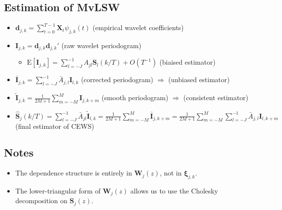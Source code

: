 \documentclass{article}
\numberwithin{equation}{section}
\let \oldsum \sum
\renewcommand{\sum}{\displaystyle \oldsum}
\newcommand{\CEWS}[2]{\bm{S}_{#1}\left(#2/T\right)}
\newcommand{\wavelet}[3]{\psi_{#1,#2}(#3)}
\newcommand{\increment}[2]{\bm{\xi}_{#1,#2}}
\newcommand{\coeffs}[2]{\bm{d}_{#1,#2}}
\newcommand{\rawPeriodo}[2]{\bm{I}_{#1,#2}}
\newcommand{\correctedPeriodo}[2]{\bar{\bm{I}}_{#1,#2}}
\newcommand{\smoothPeriodo}[2]{\widetilde{\bm{I}}_{#1,#2}}
\newcommand{\estimCEWS}[2]{\widehat{\bm{S}}_{#1}\left(#2/T\right)}
\newcommand{\E}[1]{\mathrm{E}\left[#1\right]}
\begin{document}
\subsection{Estimation of MvLSW}
\begin{itemize}
	\item $\coeffs{j}{k} = \sum_{t=0}^{T-1}\bm{X}_t \wavelet{j}{k}{t}$  \hspace{2cm} (empirical wavelet coefficients)
	\item $\rawPeriodo{j}{k} = \coeffs{j}{k}\coeffs{j}{k}'$  \hspace{2cm} (raw wavelet periodogram)
		\begin{itemize}
			\item $\E{\rawPeriodo{j}{k}} = \sum_{l=-J}^{-1} A_{jl}\CEWS{l}{k} + O(T^{-1})$ \hspace{2cm} (biaised estimator)
		\end{itemize}
	\item $\correctedPeriodo{j}{k} = \sum_{l=-J}^{-1} \bar{A}_{j,l}\rawPeriodo{l}{k}$ \hspace{2cm} (corrected periodogram) $\Longrightarrow$ (unbiased estimator)
	\item $\smoothPeriodo{j}{k} = \frac{\displaystyle 1}{\displaystyle 2M+1} \sum_{m=-M}^{M}\rawPeriodo{j}{k+m} $ \hspace{2cm} (smooth periodogram) $\Longrightarrow$ (consistent estimator)
	\item $\estimCEWS{j}{k} = \sum_{l=-J}^{-1}\bar{A}_{jl}\smoothPeriodo{l}{k} = \frac{\displaystyle 1}{\displaystyle 2M+1} \sum_{m=-M}^{M}\correctedPeriodo{j}{k+m} = \frac{\displaystyle 1}{\displaystyle 2M+1} \sum_{m=-M}^{M}\sum_{l=-J}^{-1} \bar{A}_{j,l}\rawPeriodo{l}{k+m}$ \hspace{1cm} (final estimator of CEWS)
\end{itemize}

\subsection{Notes}
	\begin{itemize}
		\item The dependence structure is entirely in $\bm{W}_{j}(z)$, not in $\increment{j}{k}$.
		\item The lower-triangular form of $\bm{W}_{j}(z)$ allows us to use the Cholesky decomposition on $\bm{S}_{j}(z)$.
	\end{itemize}
\end{document}
